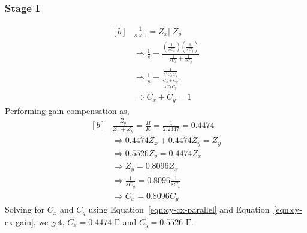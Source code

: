 \documentclass{lab_sheet}
\newcommand\ddfrac[2]{\frac{\displaystyle #1}{\displaystyle #2}}
\begin{document}
\subsubsection*{Stage I}
\begin{equation}
    \begin{aligned}[b]
       &\frac{1}{s\times1}=Z_x||Z_y\\
       &\Rightarrow \frac{1}{s}=\ddfrac{\left(\frac{1}{sC_x}\right)\left(\frac{1}{sC_y}\right)}{\frac{1}{sC_x}+\frac{1}{sC_y}}\\
       &\Rightarrow \frac{1}{s}=\ddfrac{\frac{1}{s^2C_xC_y}}{\frac{C_x+C_y}{sCxC_y}}\\
       &\Rightarrow C_x+C_y=1
    \end{aligned}
    \label{eqn:cy-cx-parallel}
\end{equation}
Performing gain compensation as,
\begin{equation}
    \begin{aligned}[b]
        &\frac{Z_y}{Z_x+Z_y}=\frac{H}{K}=\frac{1}{2.2347}=0.4474\\
        &\Rightarrow 0.4474Z_x+0.4474Z_y=Z_y\\
        &\Rightarrow 0.5526Z_y=0.4474Z_x\\
        &\Rightarrow Z_y=0.8096 Z_x\\
        &\Rightarrow \frac{1}{sC_y}=0.8096 \frac{1}{sC_x}\\
        &\Rightarrow C_x=0.8096 C_y
    \end{aligned}
    \label{eqn:cy-cx-gain}
\end{equation}
Solving for $C_x$ and $C_y$ using Equation~\ref{eqn:cy-cx-parallel} and Equation~\ref{eqn:cy-cx-gain}, we get, $C_x=0.4474\text{ F}$ and $C_y=0.5526\text{ F}$.
\end{document}
